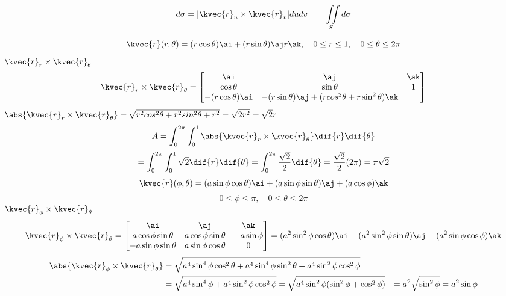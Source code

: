 \begin{equation}
d\sigma= |\kvec{r}_{u}\times \kvec{r}_{v}|dudv\quad\quad\iint\limits_{S} d\sigma
\end{equation}



 \[  \kvec{r}(r,\theta)=(r \cos\theta)\ai + (r\sin\theta)\aj r\ak , \quad  0\le r\le 1,\quad 0\le \theta\le 2\pi          \]
\(   \kvec{r}_{r} \times \kvec{r}_{\theta}          \) 
\begin{equation*}
\kvec{r}_{r}\times\kvec{r}_{\theta}=
\begin{bmatrix}
\ai       &         \aj       &       \ak \\
\cos\theta  &    \sin\theta    &   1  \\
-(r \cos\theta)\ai & -(r\sin\theta)\aj +(r cos^{2}\theta + r\sin^{2}\theta)\ak
\end{bmatrix}
\end{equation*}
\(    \abs{\kvec{r}_{r}\times \kvec{r}_{\theta}}=\sqrt{r^{2}cos^{2}\theta+r^{2}sin^{2}\theta+r^{2}}=\sqrt{2r^{2}}=\sqrt{2}r         \)   
 \[  A=\int_{0}^{2\pi}\int_{0}^{1}\abs{\kvec{r}_{r}\times \kvec{r}_{\theta}} \dif{r}\dif{\theta}           \]
 \[  =\int_{0}^{2\pi}\int_{0}^{1}\sqrt{2}\dif{r}\dif{\theta}=\int_{0}^{2\pi}\frac{\sqrt{2}}{2}\dif{\theta}=\frac{\sqrt{2}}{2} (2\pi)=\pi \sqrt{2}           \]
\[\kvec{r}(\phi, \theta)= (a \sin\phi \cos\theta)\ai +(a\sin\phi\sin\theta)\aj+(a\cos\phi)\ak       \]
 \[    0\le\phi\le\pi,\quad 0\le\theta\le2\pi          \]
\(     \kvec{r}_{\phi}\times \kvec{r}_{\theta}        \)    
\begin{equation}
 \kvec{r}_{\phi}\times \kvec{r}_{\theta} =
\begin{bmatrix}
\ai                    &              \aj                     &          \ak\\
a\cos\phi\sin\theta & a\cos\phi\sin\theta & -a\sin\phi\\
-a\sin\phi\sin\theta & a\sin\phi\cos\theta & 0\\
\end{bmatrix}
=(a^{2}\sin^{2}\phi\cos\theta)\ai+(a^{2}\sin^{2}\phi\sin\theta)\aj+(a^{2}\sin\phi\cos\phi)\ak
\end{equation}
\begin{align}
\abs{\kvec{r}_{\phi}\times\kvec{r}_{\theta}}&=\sqrt{a^{4}\sin^{4}\phi\cos^{2}\theta+a^{4}\sin^{4}\phi\sin^{2}\theta+a^{4}\sin^{2}\phi\cos^{2}\phi}\\
&=\sqrt{ a^{4}\sin^{4}\phi+a^{4}\sin^{2}\phi\cos^{2}\phi     }=\sqrt{a^{4}\sin^{2}\phi(\sin^{2}\phi +\cos^{2}\phi)    }
&=a^{2}\sqrt{\sin^{2}\phi}=a^{2}\sin\phi
\end{align}

